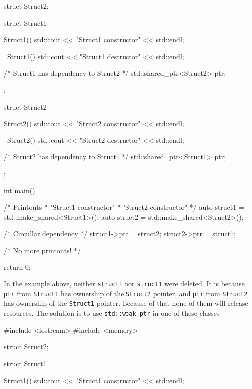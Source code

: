 \documentclass[../main]{subfiles}
\begin{document}
\begin{itemize}
\begin{Code}
        struct Struct2;
        
        struct Struct1
        {
            Struct1()
            {
                std::cout << "Struct1 constructor" << std::endl;
            }
            
            ~Struct1()
            {
                std::cout << "Struct1 destructor" << std::endl;
            }
            
            /* Struct1 has dependency to Struct2 */
            std::shared_ptr<Struct2> ptr;  
        };
        
        struct Struct2
        {
            Struct2()
            {
                std::cout << "Struct2 constructor" << std::endl;
            }
            
            ~Struct2()
            {
                std::cout << "Struct2 destructor" << std::endl;
            }  
            
            /* Struct2 has dependency to Struct1 */
            std::shared_ptr<Struct1> ptr;
        };
        
        int main()
        {
            {
                /* Printouts
                 * "Struct1 constructor"
                 * "Struct2 constructor"
                 */
                auto struct1 = std::make_shared<Struct1>();
                auto struct2 = std::make_shared<Struct2>();
                
                /* Circullar dependency */
                struct1->ptr = struct2;
                struct2->ptr = struct1;
            }
            
            /* No more printouts! */
            
            return 0;
        }
    \end{Code}
    \noindent
    In the example above, neither \texttt{struct1} nor \texttt{struct1} were deleted. It is because \texttt{ptr} from \texttt{Struct1} has ownership
    of the \texttt{Struct2} pointer, and \texttt{ptr} from \texttt{Struct2} has ownership of the \texttt{Struct1} pointer. Because of that none of
    them will release resources. The solution is to use \texttt{std::weak\_ptr} in one of these classes
    \begin{Code}
        #include <iostream>
        #include <memory>
        
        struct Struct2;
        
        struct Struct1
        {
            Struct1()
            {
                std::cout << "Struct1 constructor" << std::endl;
            }
            
}
\end{Code}
\end{itemize}
\end{document}
